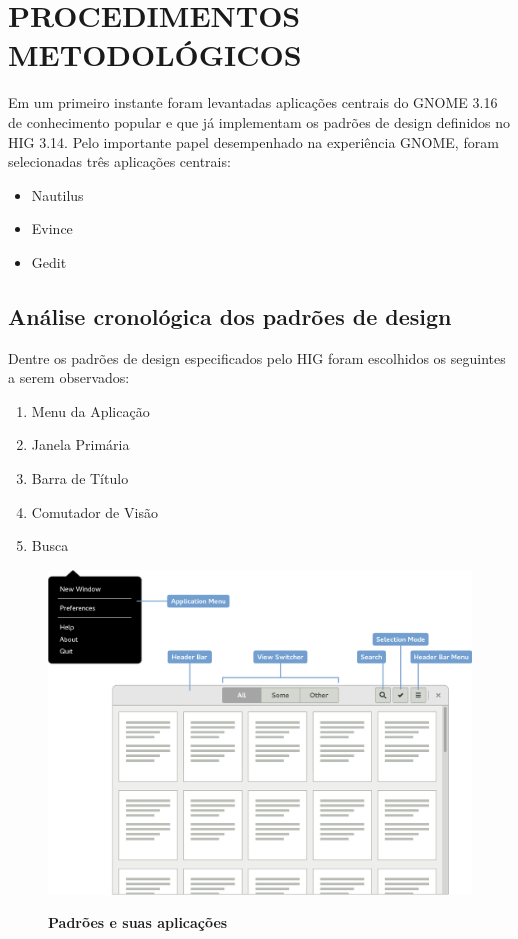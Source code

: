 \chapter{PROCEDIMENTOS METODOLÓGICOS}

Em um primeiro instante foram levantadas aplicações centrais do GNOME 3.16 de
conhecimento popular e que já implementam os padrões de design definidos no HIG
3.14. Pelo importante papel desempenhado na experiência GNOME, foram
selecionadas três aplicações centrais:

\begin{itemize}
    \item Nautilus
    \item Evince
    \item Gedit
\end{itemize}

\section{Análise cronológica dos padrões de design}

Dentre os padrões de design especificados pelo HIG \cite{hig314patterns} foram
escolhidos os seguintes a serem observados:

\begin{enumerate}
  \item Menu da Aplicação
  \item Janela Primária
  \item Barra de Título
  \item Comutador de Visão
  \item Busca
\end{enumerate}

\begin{figure}[htb]
  \begin{center}
    \caption{\textbf{Padrões e suas aplicações}}\label{gnome-hig-patterns}
    \includegraphics[width=\textwidth]{image/hig/patterns.eps}
    \label{gnome-hig-patterns}
  \end{center}
\end{figure}


